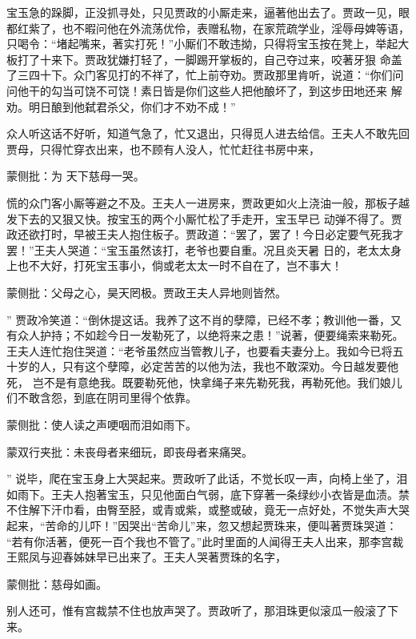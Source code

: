 \begin{parag}


    宝玉急的跺脚，正没抓寻处，只见贾政的小厮走来，逼著他出去了。贾政一见，眼都红紫了，也不暇问他在外流荡优伶，表赠私物，在家荒疏学业，淫辱母婢等语，只喝令：“堵起嘴来，著实打死！”小厮们不敢违拗，只得将宝玉按在凳上，举起大板打了十来下。贾政犹嫌打轻了，一脚踢开掌板的，自己夺过来，咬著牙狠 命盖了三四十下。众门客见打的不祥了，忙上前夺劝。贾政那里肯听，说道：“你们问问他干的勾当可饶不可饶！素日皆是你们这些人把他酿坏了，到这步田地还来 解劝。明日酿到他弑君杀父，你们才不劝不成！”
\end{parag}


\begin{parag}


    众人听这话不好听，知道气急了，忙又退出，只得觅人进去给信。王夫人不敢先回贾母，只得忙穿衣出来，也不顾有人没人，忙忙赶往书房中来，\begin{note}蒙侧批：为 天下慈母一哭。\end{note}慌的众门客小厮等避之不及。王夫人一进房来，贾政更如火上浇油一般，那板子越发下去的又狠又快。按宝玉的两个小厮忙松了手走开，宝玉早已 动弹不得了。贾政还欲打时，早被王夫人抱住板子。贾政道：“罢了，罢了！今日必定要气死我才罢！”王夫人哭道：“宝玉虽然该打，老爷也要自重。况且炎天暑 日的，老太太身上也不大好，打死宝玉事小，倘或老太太一时不自在了，岂不事大！\begin{note}蒙侧批：父母之心，昊天罔极。贾政王夫人异地则皆然。\end{note}” 贾政冷笑道：“倒休提这话。我养了这不肖的孽障，已经不孝；教训他一番，又有众人护持；不如趁今日一发勒死了，以绝将来之患！”说著，便要绳索来勒死。王夫人连忙抱住哭道：“老爷虽然应当管教儿子，也要看夫妻分上。我如今已将五十岁的人，只有这个孽障，必定苦苦的以他为法，我也不敢深劝。今日越发要他死， 岂不是有意绝我。既要勒死他，快拿绳子来先勒死我，再勒死他。我们娘儿们不敢含怨，到底在阴司里得个依靠。\begin{note}蒙侧批：使人读之声哽咽而泪如雨下。\end{note}\begin{note}蒙双行夹批：未丧母者来细玩，即丧母者来痛哭。\end{note}” 说毕，爬在宝玉身上大哭起来。贾政听了此话，不觉长叹一声，向椅上坐了，泪如雨下。王夫人抱著宝玉，只见他面白气弱，底下穿著一条绿纱小衣皆是血渍。禁不住解下汗巾看，由臀至胫，或青或紫，或整或破，竟无一点好处，不觉失声大哭起来，“苦命的儿吓！”因哭出“苦命儿”来，忽又想起贾珠来，便叫著贾珠哭道： “若有你活著，便死一百个我也不管了。”此时里面的人闻得王夫人出来，那李宫裁王熙凤与迎春姊妹早已出来了。王夫人哭著贾珠的名字，\begin{note}蒙侧批：慈母如画。\end{note}别人还可，惟有宫裁禁不住也放声哭了。贾政听了，那泪珠更似滚瓜一般滚了下来。
\end{parag}


